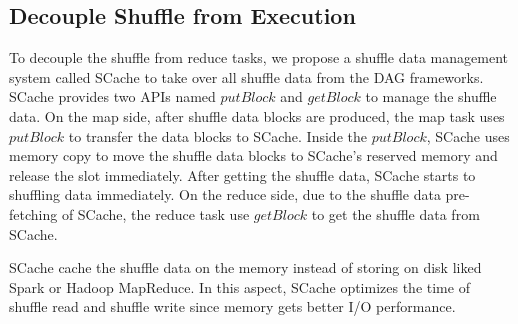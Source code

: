 \subsection{Decouple Shuffle from Execution}
{\color{blue}
To decouple the shuffle from reduce tasks, we propose a shuffle data management system called SCache to take over all shuffle data from the DAG frameworks.
SCache provides two APIs named $putBlock$ and $getBlock$ to manage the shuffle data.
On the map side, after shuffle data blocks are produced, the map task uses $putBlock$ to transfer the data blocks to SCache.
Inside the $putBlock$, SCache uses memory copy to move the shuffle data blocks to SCache's reserved memory and release the slot immediately.
After getting the shuffle data, SCache starts to shuffling data immediately.
On the reduce side, due to the shuffle data pre-fetching of SCache, the reduce task use $getBlock$ to get the shuffle data from SCache.

SCache cache the shuffle data on the memory instead of storing on disk liked Spark or Hadoop MapReduce.
In this aspect, SCache optimizes the time of shuffle read and shuffle write since memory gets better I/O performance.
}


